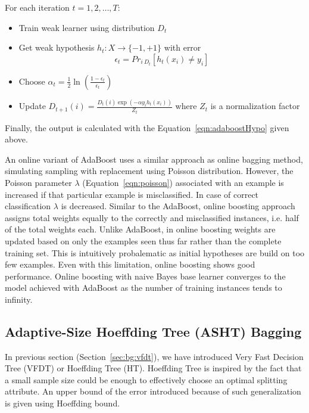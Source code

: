 \documentclass[a4paper, 11pt, oneside]{book}
\begin{document}
For each iteration $t= 1, 2, \dots, T$:
\begin{itemize}
    \item Train weak learner using distribution $D_t$
    \item Get weak hypothesis $h_t : X \rightarrow \{-1, +1\}$ with error
    \[
        \epsilon_t = Pr_{i ~ D_t} [h_t(x_i) \ne y_i]
    \]
    \item Choose $\alpha_t = \frac{1}{2} \ln \left( \frac{1 - \epsilon_t}{\epsilon_t} \right)$
    \item Update $D_{t+1} (i) = \frac{D_t(i) \exp(-\alpha y_i h_t(x_i))}{Z_t}$ where $Z_t$ is a normalization factor
\end{itemize}
Finally, the output is calculated with the Equation~\ref{eqn:adaboostHypo} given above.

An online variant of AdaBoost uses a similar approach as online bagging method, simulating sampling with replacement using Poisson distribution. However, the Poisson parameter $\lambda$ (Equation~\ref{eqn:poisson}) associated with an example is increased if that particular example is misclassified. In case of correct classification $\lambda$ is decreased. Similar to the AdaBoost, online boosting approach assigns total weights equally to the correctly and misclassified instances, i.e. half of the total weights each. Unlike AdaBoost, in online boosting weights are updated based on only the examples seen thus far rather than the complete training set. This is intuitively probalematic as initial hypotheses are build on too few examples. Even with this limitation, online boosting shows good performance. Online boosting with naive Bayes base learner converges to the model achieved with AdaBoost as the number of training instances tends to infinity.

\subsection{Adaptive-Size Hoeffding Tree (ASHT) Bagging}
In previous section (Section~\ref{sec:bg:vfdt}), we have introduced Very Fast Decision Tree (VFDT) or Hoeffding Tree (HT). Hoeffding Tree is inspired by the fact that a small sample size could be enough to effectively choose an optimal splitting attribute. An upper bound of the error introduced because of such generalization is given using Hoeffding bound.
\end{document}
